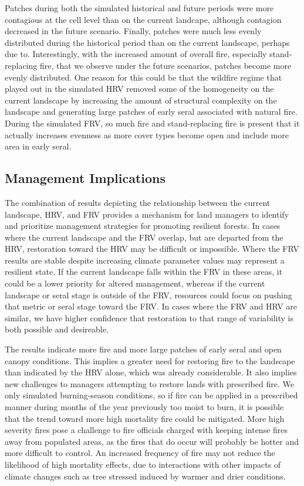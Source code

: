 \documentclass[12pt]{article}
\begin{document}
\begin{spacing}{1}
Patches during both the simulated historical and future periods were more contagious at the cell level than on the current landcape, although contagion decreased in the future scenario. Finally, patches were much less evenly distributed during the historical period than on the current landscape, perhaps due to. Interestingly, with the increased amount of overall fire, especially stand-replacing fire, that we observe under the future scenarios, patches become more evenly distributed. One reason for this could be that the wildfire regime that played out in the simulated HRV removed some of the homogeneity on the current landscape by increasing the amount of structural complexity on the landscape and generating large patches of early seral associated with natural fire. During the simulated FRV, so much fire and stand-replacing fire is present that it actually increases evenness as more cover types become open and include more area in early seral.

\subsection*{Management Implications}

The combination of results depicting the relationship between the current landscape, HRV, and FRV provides a mechanism for land managers to identify and prioritize management strategies for promoting resilient forests. In cases where the current landscape and the FRV overlap, but are departed from the HRV, restoration toward the HRV may be difficult or impossible. Where the FRV results are stable despite increasing climate parameter values may represent a resilient state. If the current landscape falls within the FRV in these areas, it could be a lower priority for altered management, whereas if the current landscape or seral stage is outside of the FRV, resources could focus on pushing that metric or seral stage toward the FRV. In cases where the FRV and HRV are similar, we have higher confidence that restoration to that range of variability is both possible and desireable.

The results indicate more fire and more large patches of early seral and open canopy conditions. This implies a greater need for restoring fire to the landscape than indicated by the HRV alone, which was already considerable. It also implies new challenges to managers attempting to restore lands with prescribed fire. We only simulated burning-season conditions, so if fire can be applied in a prescribed manner during months of the year previously too moist to burn, it is possible that the trend toward more high mortality fire could be mitigated. More high severity fires pose a challenge to fire officials charged with keeping intense fires away from populated areas, as the fires that do occur will probably be hotter and more difficult to control. An increased frequency of fire may not reduce the likelihood of high mortality effects, due to interactions with other impacts of climate changes such as tree stressed induced by warmer and drier conditions.


\end{spacing}
\end{document}
